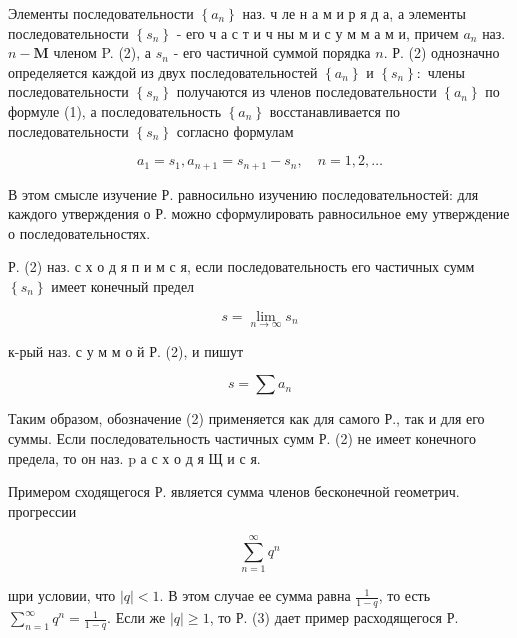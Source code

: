 \documentclass[10pt]{article}
\begin{document}
Элементы последовательности $\left\{a_{n}\right\}$ наз. ч ле н а м и р я д а, а элементы последовательности $\left\{s_{n}\right\}$ - его ч а с т и ч ны м и с у м м а м и, причем $a_{n}$ наз. $n-\mathbf{M}$ членом P. (2), а $s_{n}$ - его частичной суммой порядка $n$. Р. (2) однозначно определяется каждой из двух последовательностей $\left\{a_{n}\right\}$ и $\left\{s_{n}\right\}:$ члены последовательности $\left\{s_{n}\right\}$ получаются из членов последовательности $\left\{a_{n}\right\}$ по формуле (1), а последовательность $\left\{a_{n}\right\}$ восстанавливается по последовательности $\left\{s_{n}\right\}$ согласно формулам



\[

a_{1}=s_{1}, a_{n+1}=s_{n+1}-s_{n}, \quad n=1,2, \ldots

\]



В этом смысле изучение Р. равносильно изучению последовательностей: для каждого утверждения о Р. можно сформулировать равносильное ему утверждение о последовательностях.



Р. (2) наз. с х о д я п и м с я, если последовательность его частичных сумм $\left\{s_{n}\right\}$ имеет конечный предел



\[

s=\lim _{n \rightarrow \infty} s_{n}

\]



к-рый наз. с у м м о й Р. (2), и пишут



\[

s=\sum a_{n}

\]



Таким образом, обозначение (2) применяется как для самого Р., так и для его суммы. Если последовательность частичных сумм Р. (2) не имеет конечного предела, то он наз. $\mathrm{p}$ а с х о д я Щ и с я.



Примером сходящегося Р. является сумма членов бесконечной геометрич. прогрессии



\[

\sum_{n=1}^{\infty} q^{n}

\]



шри условии, что $|q|<1$. В этом случае ее сумма равна $\frac{1}{1-q}$, то есть $\sum_{n=1}^{\infty} q^{n}=\frac{1}{1-q}$. Если же $|q| \geqslant 1$, то Р. (3) дает пример расходящегося Р.
\end{document}
